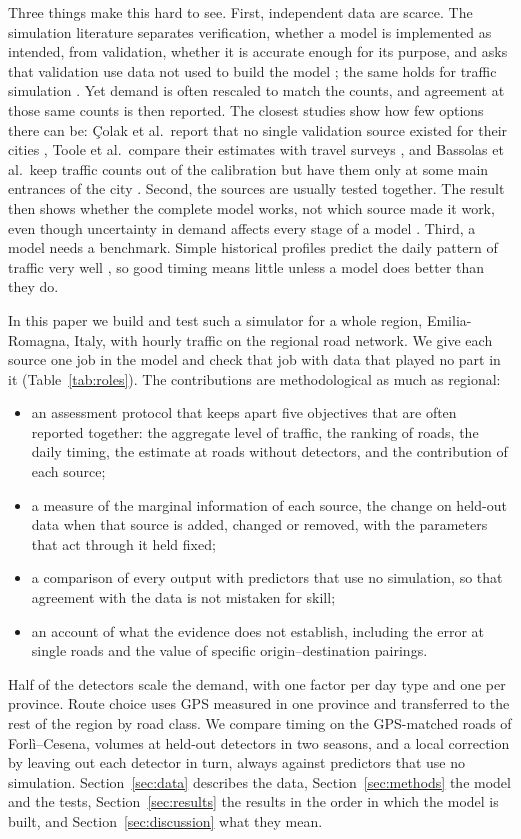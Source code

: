 \documentclass[preprint,11pt,a4paper]{elsarticle}
\begin{document}
Three things make this hard to see. First, independent data are scarce. The simulation literature separates verification, whether a model is implemented as intended, from validation, whether it is accurate enough for its purpose, and asks that validation use data not used to build the model \cite{kleijnen1995,sargent2013}; the same holds for traffic simulation \cite{toledo2004,hollander2008}. Yet demand is often rescaled to match the counts, and agreement at those same counts is then reported. The closest studies show how few options there can be: \c{C}olak et al.\ report that no single validation source existed for their cities \cite{colak2016}, Toole et al.\ compare their estimates with travel surveys \cite{toole2015}, and Bassolas et al.\ keep traffic counts out of the calibration but have them only at some main entrances of the city \cite{bassolas2019}. Second, the sources are usually tested together. The result then shows whether the complete model works, not which source made it work, even though uncertainty in demand affects every stage of a model \cite{zhao2002,rasouli2012}. Third, a model needs a benchmark. Simple historical profiles predict the daily pattern of traffic very well \cite{lippi2013,vlahogianni2014}, so good timing means little unless a model does better than they do.

In this paper we build and test such a simulator for a whole region, Emilia-Romagna, Italy, with hourly traffic on the regional road network. We give each source one job in the model and check that job with data that played no part in it (Table~\ref{tab:roles}). The contributions are methodological as much as regional:
\begin{itemize}
\item an assessment protocol that keeps apart five objectives that are often reported together: the aggregate level of traffic, the ranking of roads, the daily timing, the estimate at roads without detectors, and the contribution of each source;
\item a measure of the marginal information of each source, the change on held-out data when that source is added, changed or removed, with the parameters that act through it held fixed;
\item a comparison of every output with predictors that use no simulation, so that agreement with the data is not mistaken for skill;
\item an account of what the evidence does not establish, including the error at single roads and the value of specific origin--destination pairings.
\end{itemize}
Half of the detectors scale the demand, with one factor per day type and one per province. Route choice uses GPS measured in one province and transferred to the rest of the region by road class. We compare timing on the GPS-matched roads of Forl\`i--Cesena, volumes at held-out detectors in two seasons, and a local correction by leaving out each detector in turn, always against predictors that use no simulation. Section~\ref{sec:data} describes the data, Section~\ref{sec:methods} the model and the tests, Section~\ref{sec:results} the results in the order in which the model is built, and Section~\ref{sec:discussion} what they mean.
\end{document}
